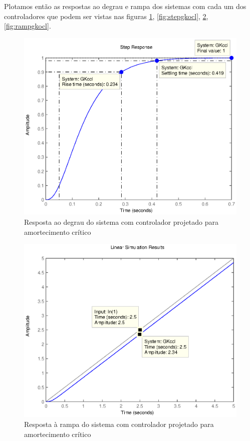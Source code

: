 \documentclass{article}
\begin{document}
 Plotamos então as respostas ao degrau e rampa dos sistemas com cada um dos controladores que podem ser vistas nas figuras \ref{fig:stepgkccl}, \ref{fig:stepgkocl}, \ref{fig:rampgkccl}, \ref{fig:rampgkocl}.
 
 \begin{figure}[H]
 	\centering
 	\includegraphics[width=0.8\linewidth]{stepgkccl}
 	\caption{Resposta ao degrau do sistema com controlador projetado para amortecimento crítico}
 	\label{fig:stepgkccl}
 \end{figure}
 
  \begin{figure}[H]
  	\centering
  	\includegraphics[width=0.8\linewidth]{rampgkccl}
  	\caption{Resposta à rampa do sistema com controlador projetado para amortecimento crítico}
  	\label{fig:rampgkccl}
  \end{figure}
  
\end{document}
